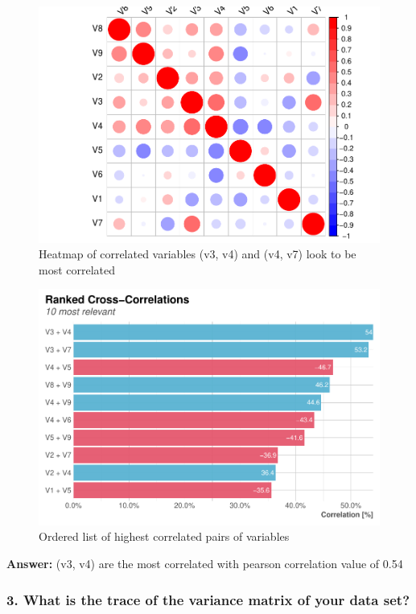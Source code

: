 \documentclass[
  8pt,
]{article}
\begin{document}
\begin{figure}

{\centering \includegraphics[width=0.65\linewidth,height=0.65\textheight]{Report_files/figure-latex/heatmap-1} 

}

\caption{Heatmap of correlated variables (v3, v4) and (v4, v7) look to be most correlated}\label{fig:heatmap}
\end{figure}
\begin{figure}

{\centering \includegraphics[width=0.65\linewidth,height=0.65\textheight]{Report_files/figure-latex/correlated_list-1} 

}

\caption{Ordered list of highest correlated pairs of variables}\label{fig:correlated_list}
\end{figure}

\textbf{Answer: }(v3, v4) are the most correlated with pearson
correlation value of 0.54

\hypertarget{what-is-the-trace-of-the-variance-matrix-of-your-data-set}{%
\subsubsection{3. What is the trace of the variance matrix of your data
set?}\label{what-is-the-trace-of-the-variance-matrix-of-your-data-set}}
\end{document}
